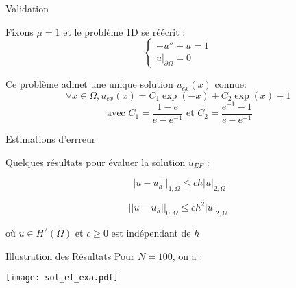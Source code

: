 \documentclass[10pt]{beamer}
\begin{document}
\begin{frame}{Validation}

Fixons $\mu = 1$ et le problème 1D se réécrit :
\begin{equation*}
\begin{cases}
-u'' + u = 1 \\
u|_{\partial \Omega} = 0
\end{cases}
\end{equation*}

Ce problème admet une unique solution $u_{ex}(x)$ connue:
$$
\forall x \in \Omega, u_{ex}(x) = C_{1}\exp(-x) + C_{2}\exp(x) +1 
$$
$$
\text{ avec }  C_{1} = \frac{1-e}{e - e^{-1}} \text{ et } C_{2} = \frac{e^{-1} - 1}{e - e^{-1}} 
$$

\end{frame}

\begin{comment}
On vérifie que si $\mu = 1 $ la solution éléments finis $u_{EF}$ est cohérente avec la solution exacte $u_{ex}$.
\end{comment}


\begin{frame}{Estimations d'errreur}


Quelques résultats pour évaluer la solution $u_{EF}$ : 

 $$ ||u-u_{h}||_{1,\Omega} \leq ch|u|_{2,\Omega} $$


 $$||u-u_{h}||_{0,\Omega} \leq ch^{2}|u|_{2,\Omega}$$

où $ u \in H^{2}(\Omega)$ et $c \geq 0 $ est indépendant de $h$

\end{frame}

\begin{comment}
On note $||.||_1$ la norme $H^{1}$, et $||.||_0$ la norme $L^{2}$
\end{comment}

\begin{frame}{Illustration des Résultats}
Pour $N = 100$, on a :

\begin{center}
\texttt{[image: sol\_ef\_exa.pdf]}
\end{center}

\end{frame}
\end{document}
